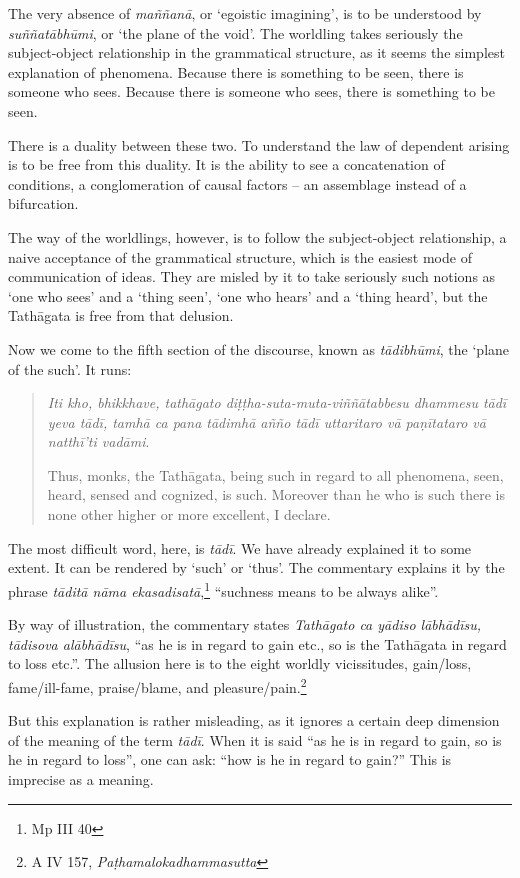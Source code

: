 The very absence of \emph{maññanā}, or `egoistic imagining', is to be understood by \emph{suññatābhūmi}, or `the plane of the void'. The worldling takes seriously the subject-object relationship in the grammatical structure, as it seems the simplest explanation of phenomena. Because there is something to be seen, there is someone who sees. Because there is someone who sees, there is something to be seen.

There is a duality between these two. To understand the law of dependent arising is to be free from this duality. It is the ability to see a concatenation of conditions, a conglomeration of causal factors -- an assemblage instead of a bifurcation.

The way of the worldlings, however, is to follow the subject-object relationship, a naive acceptance of the grammatical structure, which is the easiest mode of communication of ideas. They are misled by it to take seriously such notions as `one who sees' and a `thing seen', `one who hears' and a `thing heard', but the Tathāgata is free from that delusion.

Now we come to the fifth section of the discourse, known as \emph{tādibhūmi}, the `plane of the such'. It runs:

\begin{quote}
\emph{Iti kho, bhikkhave, tathāgato diṭṭha-suta-muta-viññātabbesu dhammesu tādī yeva tādī, tamhā ca pana tādimhā añño tādī uttaritaro vā paṇītataro vā natthī'ti vadāmi}.

Thus, monks, the Tathāgata, being such in regard to all phenomena, seen, heard, sensed and cognized, is such. Moreover than he who is such there is none other higher or more excellent, I declare.
\end{quote}

The most difficult word, here, is \emph{tādī}. We have already explained it to some extent. It can be rendered by `such' or `thus'. The commentary explains it by the phrase \emph{tāditā nāma ekasadisatā},\footnote{Mp III 40} ``suchness means to be always alike''.

By way of illustration, the commentary states \emph{Tathāgato ca yādiso lābhādīsu, tādisova alābhādīsu}, ``as he is in regard to gain etc., so is the Tathāgata in regard to loss etc.''. The allusion here is to the eight worldly vicissitudes, gain/loss, fame/ill-fame, praise/blame, and pleasure/pain.\footnote{A IV 157, \emph{Paṭhamalokadhammasutta}}

But this explanation is rather misleading, as it ignores a certain deep dimension of the meaning of the term \emph{tādī}. When it is said ``as he is in regard to gain, so is he in regard to loss'', one can ask: ``how is he in regard to gain?'' This is imprecise as a meaning.

